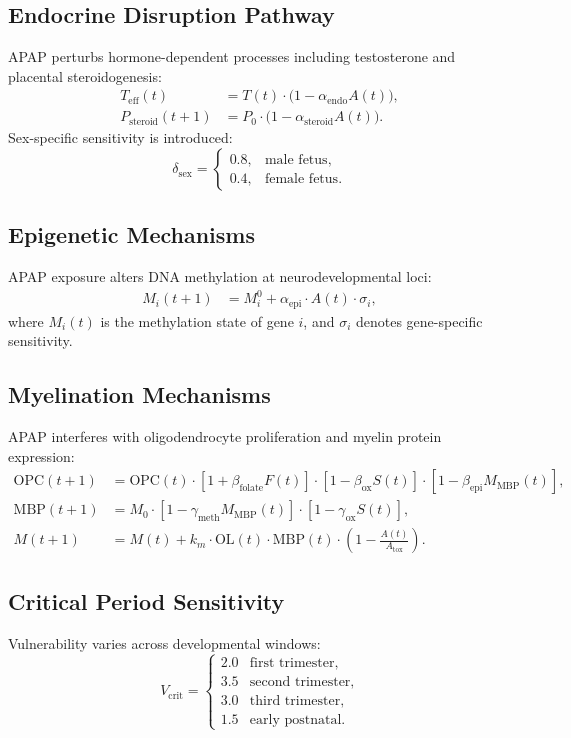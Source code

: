 \documentclass[12pt]{article}
\begin{document}
\subsection{Endocrine Disruption Pathway}
APAP perturbs hormone-dependent processes including testosterone and placental steroidogenesis:
\begin{align}
T_{\text{eff}}(t) &= T(t) \cdot \big(1 - \alpha_{\text{endo}} A(t)\big), \\
P_{\text{steroid}}(t+1) &= P_{0} \cdot \big(1 - \alpha_{\text{steroid}} A(t)\big).
\end{align}
Sex-specific sensitivity is introduced:
\[
\delta_{\text{sex}} =
\begin{cases}
0.8, & \text{male fetus}, \\
0.4, & \text{female fetus}.
\end{cases}
\]

\subsection{Epigenetic Mechanisms}
APAP exposure alters DNA methylation at neurodevelopmental loci:
\begin{align}
M_{i}(t+1) &= M_{i}^{0} + \alpha_{\text{epi}} \cdot A(t) \cdot \sigma_{i},
\end{align}
where $M_{i}(t)$ is the methylation state of gene $i$, and $\sigma_{i}$ denotes gene-specific sensitivity.

\subsection{Myelination Mechanisms}
APAP interferes with oligodendrocyte proliferation and myelin protein expression:
\begin{align}
\text{OPC}(t+1) &= \text{OPC}(t) \cdot \left[1 + \beta_{\text{folate}} F(t)\right]
                                \cdot \left[1 - \beta_{\text{ox}} S(t)\right]
                                \cdot \left[1 - \beta_{\text{epi}} M_{\text{MBP}}(t)\right], \\
\text{MBP}(t+1) &= M_{0} \cdot \left[1 - \gamma_{\text{meth}} M_{\text{MBP}}(t)\right]
                          \cdot \left[1 - \gamma_{\text{ox}} S(t)\right], \\
M(t+1) &= M(t) + k_{m} \cdot \text{OL}(t) \cdot \text{MBP}(t) 
                 \cdot \left(1 - \frac{A(t)}{A_{\text{tox}}}\right).
\end{align}

\subsection{Critical Period Sensitivity}
Vulnerability varies across developmental windows:
\[
V_{\text{crit}} =
\begin{cases}
2.0 & \text{first trimester}, \\
3.5 & \text{second trimester}, \\
3.0 & \text{third trimester}, \\
1.5 & \text{early postnatal}.
\end{cases}
\]
\end{document}
